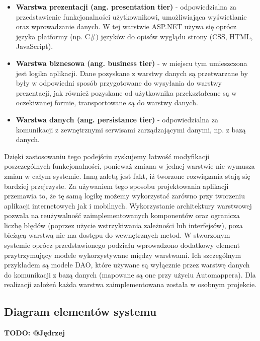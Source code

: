 \documentclass{article}
\begin{document}
\begin{itemize}
\item \textbf{Warstwa prezentacji (ang. presentation tier)} - odpowiedzialna za przedstawienie funkcjonalności użytkownikowi, umożliwiająca wyświetlanie oraz wprowadzanie danych. W tej warstwie ASP.NET używa się oprócz języka platformy (np. C\#) języków do opisów wyglądu strony (CSS, HTML, JavaScript). 
\item \textbf{Warstwa biznesowa (ang. business tier)} - w miejscu tym umieszczona jest logika aplikacji. Dane pozyskane z warstwy danych są przetwarzane by były w odpowiedni sposób przygotowane do wysyłania do warstwy prezentacji, jak również pozyskane od użytkownika przekształcane są w oczekiwanej formie, transportowane są do warstwy danych.

\item \textbf{Warstwa danych (ang. persistance tier)} - odpowiedzialna za komunikacji z zewnętrznymi serwisami zarządzającymi danymi, np. z bazą danych.
\end{itemize}

Dzięki zastosowaniu tego podejściu zyskujemy łatwość modyfikacji poszczególnych funkcjonalności, ponieważ zmiana w jednej warstwie nie wymusza zmian w całym systemie. Inną zaletą jest fakt, iż tworzone rozwiązania stają się bardziej przejrzyste. Za używaniem tego sposobu projektowania aplikacji przemawia to, że tę samą logikę możemy wykorzystać zarówno przy tworzeniu aplikacji internetowych jak i mobilnych. Wykorzystanie architektury warstwowej pozwala na reużywalność zaimplementowanych komponentów oraz ogranicza liczbę błędów (poprzez użycie wstrzykiwania zależności lub interfejsów), poza bieżącą warstwą nie ma dostępu do wewnętrznych metod. W stworzonym systemie oprócz przedstawionego podziału wprowadzono dodatkowy element przytrzymujący modele wykorzystywane między warstwami. Ich szczególnym przykładem są modele DAO, które używane są wyłącznie przez warstwę danych do komunikacji z bazą danych (mapowane są one przy użyciu Automappera). Dla realizacji założeń każda warstwa zaimplementowana została w osobnym projekcie.

\subsection{Diagram elementów systemu}

{\color{red}\textbf{TODO: @Jędrzej}}
\end{document}
